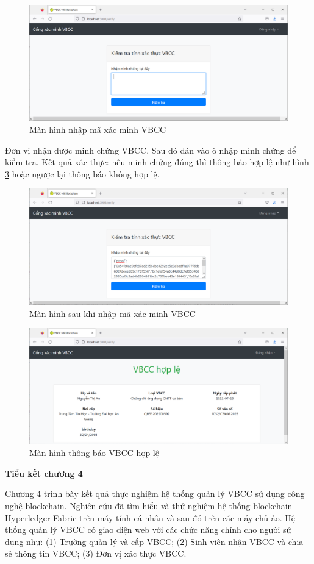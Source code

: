 \begin{figure}[H]
\centering
\includegraphics[width=.9\linewidth]{img/manhinh_donvixacminh_vbegin.PNG}
\caption{Màn hình nhập mã xác minh VBCC}
\label{fig:manhinh_donvixacminh_vbegin}
\end{figure}


Đơn vị nhận được minh chứng VBCC. 
Sau đó dán vào ô nhập minh chứng để kiểm tra.
Kết quả xác thực: nếu minh chứng đúng thì thông báo hợp lệ như hình \ref{fig:xacminh_hople} hoặc ngược lại thông báo không hợp lệ.
\begin{figure}[H]
\centering
\includegraphics[width=.9\linewidth]{img/v_begin.PNG}
\caption{Màn hình sau khi nhập mã xác minh VBCC}
\label{fig:v_begin}
\end{figure}

\begin{figure}[H]
\centering
\includegraphics[width=.9\linewidth]{img/xacminh_hople.PNG}
\caption{Màn hình thông báo VBCC hợp lệ}
\label{fig:xacminh_hople}
\end{figure}

\textbf{Tiểu kết chương 4}

Chương 4 trình bày kết quả thực nghiệm hệ thống quản lý VBCC sử dụng công nghệ blockchain. Nghiên cứu đã tìm hiểu và thử nghiệm hệ thống blockchain Hyperledger Fabric trên máy tính cá nhân và sau đó trên các máy chủ ảo. Hệ thống quản lý VBCC có giao diện web với các chức năng chính cho người sử dụng như: (1) Trường quản lý và cấp VBCC; (2) Sinh viên nhận VBCC và chia sẻ thông tin VBCC; (3) Đơn vị xác thực VBCC. 
